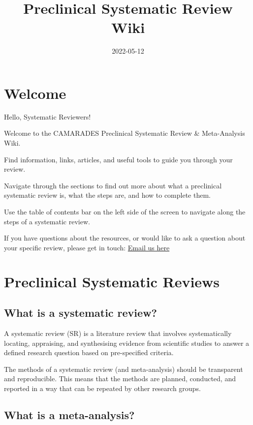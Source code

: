 \documentclass[
]{book}
\title{Preclinical Systematic Review Wiki}
\author{}
\date{\vspace{-2.5em}2022-05-12}
\begin{document}
\maketitle

{
\setcounter{tocdepth}{1}
\tableofcontents
}
\hypertarget{welcome}{%
\chapter{Welcome}\label{welcome}}

Hello, Systematic Reviewers!

Welcome to the CAMARADES Preclinical Systematic Review \& Meta-Analysis Wiki.

Find information, links, articles, and useful tools to guide you through your review.

Navigate through the sections to find out more about what a preclinical systematic review is, what the steps are, and how to complete them.

Use the table of contents bar on the left side of the screen to navigate along the steps of a systematic review.

If you have questions about the resources, or would like to ask a question about your specific review, please get in touch:
\href{mailto:CAMARADES.berlin@charite.de}{Email us here}

\hypertarget{intro}{%
\chapter{Preclinical Systematic Reviews}\label{intro}}

\hypertarget{what-is-a-systematic-review}{%
\section{What is a systematic review?}\label{what-is-a-systematic-review}}

A systematic review (SR) is a literature review that involves systematically locating, appraising, and synthesising evidence from scientific studies to answer a defined research question based on pre-specified criteria.

The methods of a systematic review (and meta-analysis) should be transparent and reproducible. This means that the methods are planned, conducted, and reported in a way that can be repeated by other research groups.

\hypertarget{what-is-a-meta-analysis}{%
\section{What is a meta-analysis?}\label{what-is-a-meta-analysis}}
\end{document}
